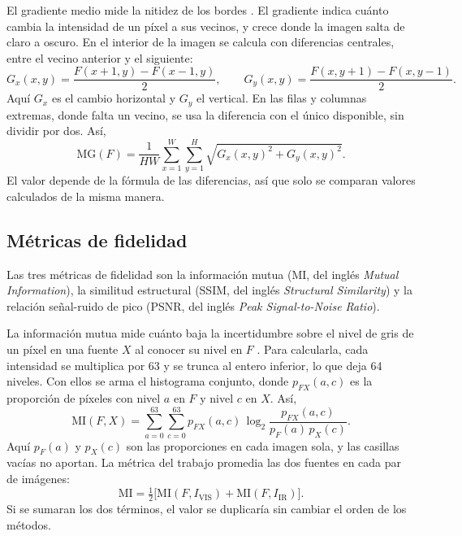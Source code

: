 El gradiente medio mide la nitidez de los bordes \parencite{singh2023}. El gradiente indica cuánto cambia
la intensidad de un píxel a sus vecinos, y crece donde la imagen salta de claro a oscuro. En el interior
de la imagen se calcula con diferencias centrales, entre el vecino anterior y el siguiente:
\begin{equation} G_x(x,y) = \frac{F(x+1,y)-F(x-1,y)}{2}, \qquad G_y(x,y) = \frac{F(x,y+1)-F(x,y-1)}{2}. \label{eq:met-gradiente} \end{equation}
Aquí $G_x$ es el cambio horizontal y $G_y$ el vertical. En las filas y columnas extremas, donde falta un
vecino, se usa la diferencia con el único disponible, sin dividir por dos. Así,
\begin{equation} \mathrm{MG}(F) = \frac{1}{HW}\sum_{x=1}^{W}\sum_{y=1}^{H}\sqrt{G_x(x,y)^2+G_y(x,y)^2}. \label{eq:met-mg} \end{equation}
El valor depende de la fórmula de las diferencias, así que solo se comparan valores calculados de la
misma manera.

\subsection{Métricas de fidelidad}

Las tres métricas de fidelidad son la información mutua (MI, del inglés \textit{Mutual Information}), la
similitud estructural (SSIM, del inglés \textit{Structural Similarity}) y la relación señal-ruido de pico
(PSNR, del inglés \textit{Peak Signal-to-Noise Ratio}).

La información mutua mide cuánto baja la incertidumbre sobre el nivel de gris de un píxel en una fuente
$X$ al conocer su nivel en $F$ \parencite{qu2002}. Para calcularla, cada intensidad se multiplica por 63
y se trunca al entero inferior, lo que deja 64 niveles. Con ellos se arma el histograma conjunto, donde
$p_{FX}(a,c)$ es la proporción de píxeles con nivel $a$ en $F$ y nivel $c$ en $X$. Así,
\begin{equation} \mathrm{MI}(F,X) = \sum_{a=0}^{63}\sum_{c=0}^{63} p_{FX}(a,c)\,\log_2\frac{p_{FX}(a,c)}{p_F(a)\,p_X(c)}. \label{eq:met-mi} \end{equation}
Aquí $p_F(a)$ y $p_X(c)$ son las proporciones en cada imagen sola, y las casillas vacías no aportan. La
métrica del trabajo promedia las dos fuentes en cada par de imágenes:
\begin{equation} \mathrm{MI} = \tfrac{1}{2}\bigl[\mathrm{MI}(F,I_{\mathrm{VIS}})+\mathrm{MI}(F,I_{\mathrm{IR}})\bigr]. \label{eq:met-mi-promedio} \end{equation}
Si se sumaran los dos términos, el valor se duplicaría sin cambiar el orden de los métodos.

